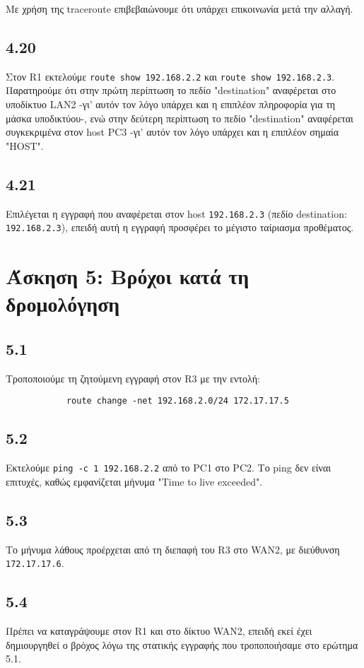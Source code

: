 \documentclass[a4paper, 12pt]{article}
\begin{document}
		Με χρήση της traceroute επιβεβαιώνουμε ότι υπάρχει επικοινωνία μετά την αλλαγή.
		
	\subsection*{4.20}
		Στον R1 εκτελούμε \verb|route show 192.168.2.2| και \verb|route show 192.168.2.3|. Παρατηρούμε ότι στην πρώτη περίπτωση το πεδίο "destination" αναφέρεται στο υποδίκτυο LAN2 -γι' αυτόν τον λόγο υπάρχει και η επιπλέον πληροφορία για τη μάσκα υποδικτύου-, ενώ στην δεύτερη περίπτωση το πεδίο "destination" αναφέρεται συγκεκριμένα στον host PC3 -γι' αυτόν τον λόγο υπάρχει και η επιπλέον σημαία "HOST". 

	\subsection*{4.21}
		Επιλέγεται η εγγραφή που αναφέρεται στον host \verb|192.168.2.3| (πεδίο destination: \verb|192.168.2.3|), επειδή αυτή η εγγραφή προσφέρει το μέγιστο ταίριασμα προθέματος.

\section*{Άσκηση 5: Βρόχοι κατά τη δρομολόγηση}

	\subsection*{5.1}
		Τροποποιούμε τη ζητούμενη εγγραφή στον R3 με την εντολή:
		
		\begin{verbatim}
			route change -net 192.168.2.0/24 172.17.17.5
		\end{verbatim}

	\subsection*{5.2}
		Εκτελούμε \verb|ping -c 1 192.168.2.2| από το PC1 στο PC2. Tο ping δεν είναι επιτυχές, καθώς εμφανίζεται μήνυμα "Time to live exceeded".

	\subsection*{5.3} 
		Το μήνυμα λάθους προέρχεται από τη διεπαφή του R3 στο WAN2, με διεύθυνση \verb|172.17.17.6|. 

	\subsection*{5.4} 
		Πρέπει να καταγράψουμε στον R1 και στο δίκτυο WAN2, επειδή εκεί έχει δημιουργηθεί ο βρόχος λόγω της στατικής εγγραφής που τροποποιήσαμε στο ερώτημα 5.1. 
\end{document}
